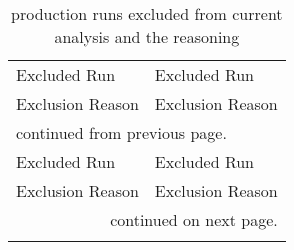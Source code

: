 \newpage
\small
\begin{center}
\begin{singlespacing}
\begin{longtable}{lr||lr}
\caption[ Production Run List Excluded From Current Analysis]{\label{tab:excluded_runs} production runs excluded from current analysis and the reasoning}\\ %

\hline \hline
\multicolumn{2}{l||}{Excluded Run}  & \multicolumn{2}{l}{Excluded Run} \\
\multicolumn{2}{r||}{Exclusion Reason} & \multicolumn{2}{r}{Exclusion Reason} \\
\hline
\endfirsthead

\multicolumn{4}{l}{\scriptsize continued from previous page.} \\
\hline
\multicolumn{2}{l||}{Excluded Run}  & \multicolumn{2}{l}{Excluded Run} \\
\multicolumn{2}{r||}{Exclusion Reason}  & \multicolumn{2}{r}{Exclusion Reason} \\
\hline
\endhead

\hline
\multicolumn{4}{r}{\scriptsize continued on next page.} \\
\endfoot

\hline \hline
\endlastfoot


\end{longtable}
\end{singlespacing}
\end{center}
